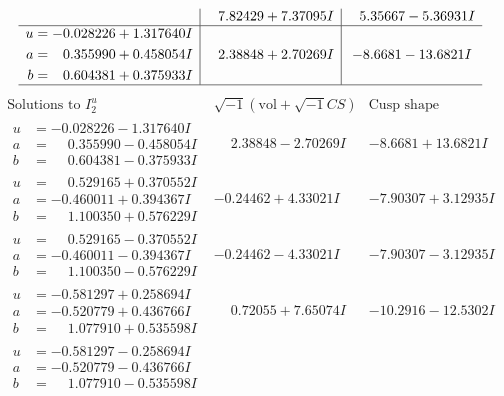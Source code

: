 \documentclass[1p]{elsarticle_modified}
\theoremstyle{definition}
\newcommand{\I}{\sqrt{-1}}
\begin{document}
$$\begin{array}{c|c|c}
 & \phantom{-}7.82429 + 7.37095 I & \phantom{-}5.35667 - 5.36931 I \\ \hline\begin{aligned}
u &= -0.028226 + 1.317640 I \\
a &= \phantom{-}0.355990 + 0.458054 I \\
b &= \phantom{-}0.604381 + 0.375933 I\end{aligned}
 & \phantom{-}2.38848 + 2.70269 I & -8.6681 - 13.6821 I\\
 \hline 
 \end{array}$$\newpage$$\begin{array}{c|c|c}  
\text{Solutions to }I^u_{2}& \I (\text{vol} + \sqrt{-1}CS) & \text{Cusp shape}\\
 \hline 
\begin{aligned}
u &= -0.028226 - 1.317640 I \\
a &= \phantom{-}0.355990 - 0.458054 I \\
b &= \phantom{-}0.604381 - 0.375933 I\end{aligned}
 & \phantom{-}2.38848 - 2.70269 I & -8.6681 + 13.6821 I \\ \hline\begin{aligned}
u &= \phantom{-}0.529165 + 0.370552 I \\
a &= -0.460011 + 0.394367 I \\
b &= \phantom{-}1.100350 + 0.576229 I\end{aligned}
 & -0.24462 + 4.33021 I & -7.90307 + 3.12935 I \\ \hline\begin{aligned}
u &= \phantom{-}0.529165 - 0.370552 I \\
a &= -0.460011 - 0.394367 I \\
b &= \phantom{-}1.100350 - 0.576229 I\end{aligned}
 & -0.24462 - 4.33021 I & -7.90307 - 3.12935 I \\ \hline\begin{aligned}
u &= -0.581297 + 0.258694 I \\
a &= -0.520779 + 0.436766 I \\
b &= \phantom{-}1.077910 + 0.535598 I\end{aligned}
 & \phantom{-}0.72055 + 7.65074 I & -10.2916 - 12.5302 I \\ \hline\begin{aligned}
u &= -0.581297 - 0.258694 I \\
a &= -0.520779 - 0.436766 I \\
b &= \phantom{-}1.077910 - 0.535598 I\end{aligned}

\end{array}$$
\end{document}
